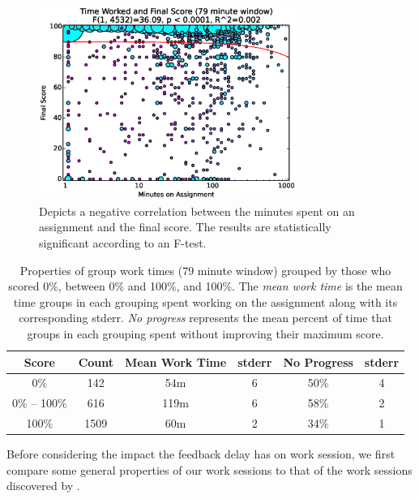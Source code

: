 \begin{figure}[!t]
\centering \includegraphics[width=3.3in]{graphs/Time_Worked_and_Final_Score_(79_minute_window).eps}
\caption{Depicts a negative correlation between the minutes spent on an
  assignment and the final score. The results are statistically significant
  according to an F-test.}
\end{figure}

\begin{table}
\centering
\begin{tabular}{|c||c|c|c|c|c|} \hline
Score & Count & Mean Work Time & stderr & No Progress & stderr \\ \hline \hline
0\% & 142 & 54m & 6 & 50\% & 4 \\ \hline
0\% -- 100\% & 616 & 119m & 6 & 58\% & 2 \\ \hline
100\% & 1509 & 60m & 2 & 34\% & 1 \\ \hline
\end{tabular}
\caption{Properties of group work times (79 minute window) grouped by those who
  scored 0\%, between 0\% and 100\%, and 100\%. The \emph{mean work time} is
  the mean time groups in each grouping spent working on the assignment along
  with its corresponding stderr. \emph{No progress} represents the mean percent
  of time that groups in each grouping spent without improving their maximum
  score.}  
\end{table}

Before considering the impact the feedback delay has on work session, we first
compare some general properties of our work sessions to that of the work
sessions discovered by \spacco{}.


